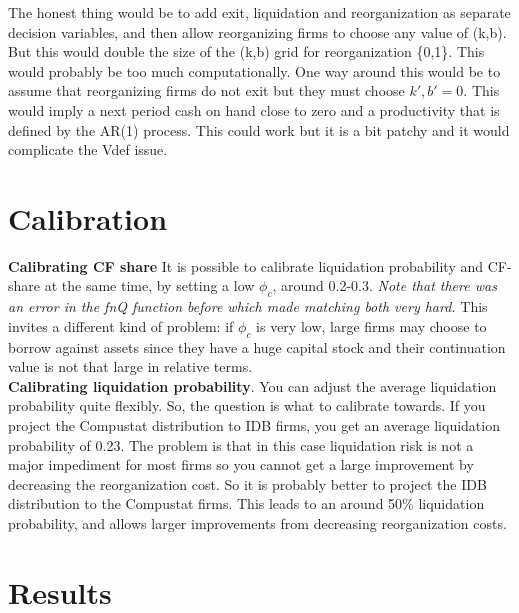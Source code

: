 \documentclass[12pt]{article}
\begin{document}
The honest thing would be to add exit, liquidation and reorganization as separate decision variables, and then allow reorganizing firms to choose any value of (k,b). But this would double the size of the (k,b) grid for reorganization \{0,1\}. This would probably be too much computationally. One way around this would be to assume that reorganizing firms do not exit but they must choose $k',b' = 0$. This would imply a next period cash on hand close to zero and a productivity that is defined by the AR(1) process. This could work but it is a bit patchy and it would complicate the Vdef issue. \vspace{3mm} \\ 
\newpage


\section*{Calibration} 
\textbf{Calibrating CF share} It is possible to calibrate liquidation probability and CF-share at the same time, by setting a low $\phi_c$, around 0.2-0.3. \textit{Note that there was an error in the fnQ function before which made matching both very hard.} This invites a different kind of problem: if $\phi_c$ is very low, large firms may choose to borrow against assets since they have a huge capital stock and their continuation value is not that large in relative terms. \\
\textbf{Calibrating liquidation probability}. You can adjust the average liquidation probability quite flexibly. So, the question is what to calibrate towards. If you project the Compustat distribution to IDB firms, you get an average liquidation probability of 0.23. The problem is that in this case liquidation risk is not a major impediment for most firms so you cannot get a large improvement by decreasing the reorganization cost. So it is probably better to project the IDB distribution to the Compustat firms. This leads to an around 50\% liquidation probability, and allows larger improvements from decreasing reorganization costs. 


\section{Results}
\end{document}
